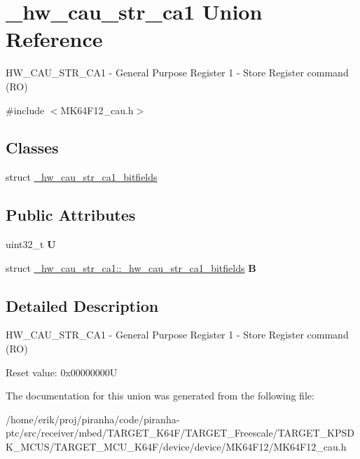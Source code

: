 \hypertarget{union__hw__cau__str__ca1}{}\section{\+\_\+hw\+\_\+cau\+\_\+str\+\_\+ca1 Union Reference}
\label{union__hw__cau__str__ca1}


H\+W\+\_\+\+C\+A\+U\+\_\+\+S\+T\+R\+\_\+\+C\+A1 -\/ General Purpose Register 1 -\/ Store Register command (RO)  




{\ttfamily \#include $<$M\+K64\+F12\+\_\+cau.\+h$>$}

\subsection*{Classes}
\begin{DoxyCompactItemize}
\item 
struct \hyperlink{struct__hw__cau__str__ca1_1_1__hw__cau__str__ca1__bitfields}{\+\_\+hw\+\_\+cau\+\_\+str\+\_\+ca1\+\_\+bitfields}
\end{DoxyCompactItemize}
\subsection*{Public Attributes}
\begin{DoxyCompactItemize}
\item 
uint32\+\_\+t {\bfseries U}\hypertarget{union__hw__cau__str__ca1_a6a7010f668a8f2ad6830052682c204ea}{}\label{union__hw__cau__str__ca1_a6a7010f668a8f2ad6830052682c204ea}

\item 
struct \hyperlink{struct__hw__cau__str__ca1_1_1__hw__cau__str__ca1__bitfields}{\+\_\+hw\+\_\+cau\+\_\+str\+\_\+ca1\+::\+\_\+hw\+\_\+cau\+\_\+str\+\_\+ca1\+\_\+bitfields} {\bfseries B}\hypertarget{union__hw__cau__str__ca1_afb98ef581a7026726bab1816099faa1f}{}\label{union__hw__cau__str__ca1_afb98ef581a7026726bab1816099faa1f}

\end{DoxyCompactItemize}


\subsection{Detailed Description}
H\+W\+\_\+\+C\+A\+U\+\_\+\+S\+T\+R\+\_\+\+C\+A1 -\/ General Purpose Register 1 -\/ Store Register command (RO) 

Reset value\+: 0x00000000U 

The documentation for this union was generated from the following file\+:\begin{DoxyCompactItemize}
\item 
/home/erik/proj/piranha/code/piranha-\/ptc/src/receiver/mbed/\+T\+A\+R\+G\+E\+T\+\_\+\+K64\+F/\+T\+A\+R\+G\+E\+T\+\_\+\+Freescale/\+T\+A\+R\+G\+E\+T\+\_\+\+K\+P\+S\+D\+K\+\_\+\+M\+C\+U\+S/\+T\+A\+R\+G\+E\+T\+\_\+\+M\+C\+U\+\_\+\+K64\+F/device/device/\+M\+K64\+F12/M\+K64\+F12\+\_\+cau.\+h\end{DoxyCompactItemize}

